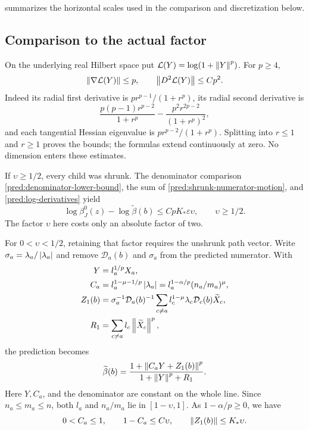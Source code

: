 summarizes the horizontal scales used in the
comparison and discretization below.


\subsection{Comparison to the actual factor}

On the underlying real Hilbert space put
\(\mathcal L(Y)=\log(1+\left\|Y\right\|^p)\). For \(p\ge4\),
\begin{equation}
 \left\|\nabla\mathcal L(Y)\right\|\le p,\qquad
 \left\|D^2\mathcal L(Y)\right\|\le C p^2.
 \label{pred:log-derivatives}
\end{equation}
Indeed its radial first derivative is \(p r^{p-1}/(1+r^p)\),
its radial second derivative is
\[
 \frac{p(p-1)r^{p-2}}{1+r^p}
       -\frac{p^2r^{2p-2}}{(1+r^p)^2},
\]
and each tangential Hessian eigenvalue is
\(p r^{p-2}/(1+r^p)\).
Splitting into \(r\le1\) and \(r\ge1\) proves the bounds; the formulas
extend continuously at zero. No dimension enters these estimates.

If \(\upsilon\ge1/2\), every child was shrunk. The denominator
comparison \eqref{pred:denominator-lower-bound}, the sum of
\eqref{pred:shrunk-numerator-motion}, and
\eqref{pred:log-derivatives} yield
\begin{equation}
 \log\beta_J^0(z)-\log\widetilde\beta(b)
       \le CpK_*\varepsilon\upsilon,\qquad \upsilon\ge1/2.
 \label{pred:balanced-comparison}
\end{equation}
The factor \(\upsilon\) here costs only an absolute factor of two.

For \(0<\upsilon<1/2\), retaining that factor requires the unshrunk
path vector. Write \(\sigma_a=\lambda_a/\left|\lambda_a\right|\) and remove
\(\mathcal D_a(b)\) and \(\sigma_a\) from the predicted numerator.
With
\begin{align*}
 Y&=l_a^{1/p}X_a,\\
 C_a&=l_a^{1-\mu-1/p}\left|\lambda_a\right|
      =l_a^{1-\alpha/p}(n_a/m_a)^\mu,\\
 Z_1(b)&=\sigma_a^{-1}\mathcal D_a(b)^{-1}
        \sum_{c\ne a}l_c^{1-\mu}\lambda_c
                         \mathcal D_c(b)\widetilde X_c,\\
 R_1&=\sum_{c\ne a}l_c\left\|\widetilde X_c\right\|^p,
\end{align*}
the prediction becomes
\begin{equation}
 \widetilde\beta(b)=
       \frac{1+\left\|C_aY+Z_1(b)\right\|^p}
            {1+\left\|Y\right\|^p+R_1}.
 \label{pred:path-baseline}
\end{equation}
Here \(Y,C_a\), and the denominator are constant on the whole line.
Since \(n_a\le m_a\le n\), both \(l_a\) and \(n_a/m_a\) lie in
\([1-\upsilon,1]\). As \(1-\alpha/p\ge0\), we have
\begin{equation}
 0<C_a\le1,\qquad 1-C_a\le C\upsilon,\qquad
 \left\|Z_1(b)\right\|\le K_*\upsilon.
 \label{pred:path-coefficient}
\end{equation}

